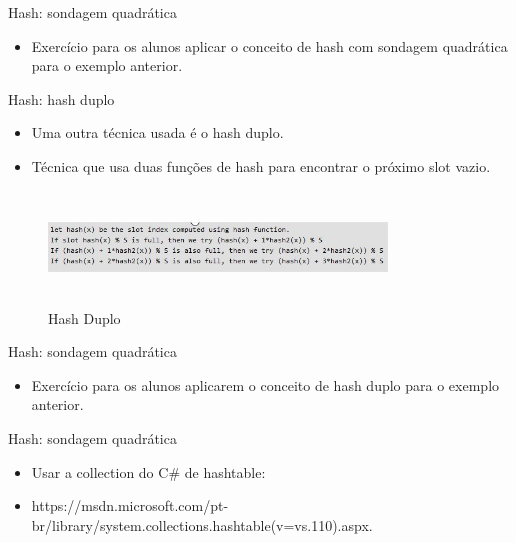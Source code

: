 \begin{frame}
	\begin{block}{Hash: sondagem quadrática}
		\begin{itemize}
			\item Exercício para os alunos aplicar o conceito de hash com sondagem quadrática para o exemplo anterior.
		\end{itemize}
	\end{block}
\end{frame}


\begin{frame}
	\begin{block}{Hash: hash duplo}
		\begin{itemize}
			\item Uma outra técnica usada é o hash duplo. 

			\item Técnica que usa duas funções de hash para encontrar o próximo slot vazio.
		\end{itemize}
				\begin{figure}[!htb]
			\centering	  				
			\includegraphics[height=3cm, width = 9cm]{./pic/doubleHash.jpg}
			\caption{Hash Duplo}
			\label{fig_pilha}
		\end{figure}
	\end{block}
\end{frame}


\begin{frame}
	\begin{block}{Hash: sondagem quadrática}
		\begin{itemize}
			\item Exercício para os alunos aplicarem o conceito de hash duplo para o exemplo anterior.
		\end{itemize}
	\end{block}
\end{frame}

\begin{frame}
	\begin{block}{Hash: sondagem quadrática}
		\begin{itemize}
			\item Usar a collection do C\# de hashtable:

			\item https://msdn.microsoft.com/pt-br/library/system.collections.hashtable(v=vs.110).aspx.
		\end{itemize}
	\end{block}
\end{frame}
 